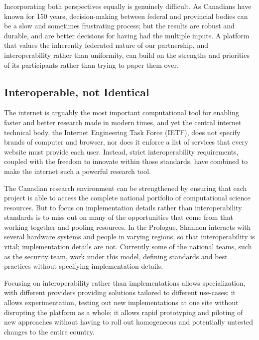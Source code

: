 \documentclass[11pt, letterpaper, twoside]{article}
\begin{document}
Incorporating both perspectives equally is genuinely difficult. As
Canadians have known for 150 years, decision-making between federal and
provincial bodies can be a slow and sometimes frustrating process; but
the results are robust and durable, and are better decisions for having
had the multiple inputs. A platform that values the inherently federated
nature of our partnership, and interoperability rather than uniformity,
can build on the strengths and priorities of its participants rather
than trying to paper them over.

\subsection*{Interoperable, not Identical}
%

The internet is arguably the most important computational tool for
enabling faster and better research made in modern times, and yet the
central internet technical body, the Internet Engineering Task Force
(IETF), does not specify brands of computer and browser, nor does it
enforce a list of services that every website must provide each user.
Instead, strict interoperability requirements, coupled with the freedom
to innovate within those standards, have combined to make the internet
such a powerful research tool.


The Canadian research environment can be strengthened by ensuring that
each project is able to access the complete national portfolio of
computational science resources. But to focus on implementation details
rather than interoperability standards is to miss out on many of the
opportunities that come from that working together and pooling
resources. In the Prologue, Shannon interacts with several hardware
systems and people in varying regions, so that interoperability is
vital; implementation details are not.  Currently some of the national
teams, such as the security team, work under this model, defining
standards and best practices without specifying implementation details.

Focusing on interoperability rather than implementations allows
specialization, with different providers providing solutions tailored to
different use-cases; it allows experimentation, testing out new
implementations at one site without disrupting the platform as a whole;
it allows rapid prototyping and piloting of new approaches without
having to roll out homogeneous and potentially untested changes to the
entire country.
\end{document}
